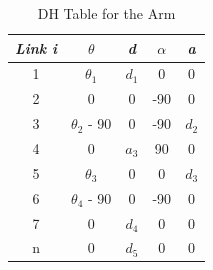 \begin{table}[H]
	\begin{center}
		\begin{tabular}{|c|c|c|c|c|} 
			\hline
			\textit{Link i} & \textit{$\theta$} & \textit{d} & \textit{$\alpha$} & \textit{a}\\
			\hline
			1 & $\theta_{1}$ & $d_{1}$ & 0 & 0 \\
			2 & 0 & 0 & -90 & 0 \\
			3 & $\theta_{2}$ - 90  & 0 & -90 & $d_{2}$ \\
			4 & 0  & $a_{3}$ & 90 & 0 \\ 
			5 & $\theta_{3}$ & 0 & 0 & $d_{3}$ \\
			6 & $\theta_{4}$ - 90 & 0 & -90 & 0 \\
			7 & 0 & $d_{4}$ & 0 & 0 \\
			n & 0 & $d_{5}$ & 0 & 0 \\
			\hline
		\end{tabular}
		\caption{\label{table:2} DH Table for the Arm }
	\end{center}
\end{table}

